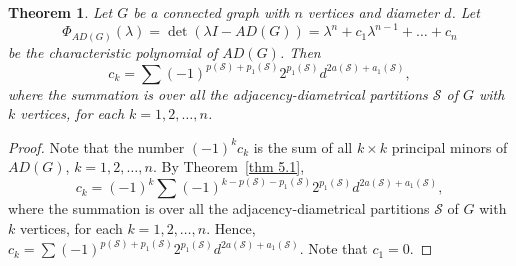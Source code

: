 \documentclass[12pt]{article}
\numberwithin{equation}{section}
\newtheorem{thm}{Theorem}[section]
\begin{document}
		\begin{thm}\label{thm 5.3}
		Let $G$ be a connected graph with $n$ vertices and  diameter $d$. Let
		\begin{equation*}
			\Phi_{AD(G)}(\lambda)=\det(\lambda I-AD(G))=\lambda^{n}+c_{1}\lambda^{n-1}+\dots+c_n
		\end{equation*}
		be the characteristic polynomial of $AD(G)$. Then
		\begin{equation}\label{e5.3}
			c_k=\sum (-1)^{p(\mathcal S)+p_1(\mathcal S)} 2^{p_{1}(\mathcal S)} d^{2 a(\mathcal S)+a_1(\mathcal S)},
		\end{equation} 
		where the summation is over all the adjacency-diametrical partitions $\mathcal S$ of $G$ with $k$ vertices, for each $k=1,2,\dots,n$. 
	\end{thm}
	\begin{proof}
		Note that the number $(-1)^k c_k$ is the sum of all $k \times k$ principal minors of $AD(G)$, $k=1,2,\dots,n$. By Theorem~\ref{thm 5.1},
		\begin{equation*}
			c_k=(-1)^{k}\sum (-1)^{k-p(\mathcal S)-p_1(\mathcal S)} 2^{p_{1}(\mathcal S)} d^{2 a(\mathcal S)+ a_1(\mathcal S)},
		\end{equation*}
		where the summation is over all the adjacency-diametrical partitions $\mathcal S$ of $G$ with $k$ vertices, for each $k=1,2,\dots,n$. Hence, $c_k=\sum (-1)^{p(\mathcal S)+p_1(\mathcal S)} 2^{p_{1}(\mathcal S)} d^{2 a(\mathcal S)+a_1(\mathcal S)}$. Note that $c_{1}=0$.
	\end{proof}
	
\end{document}
